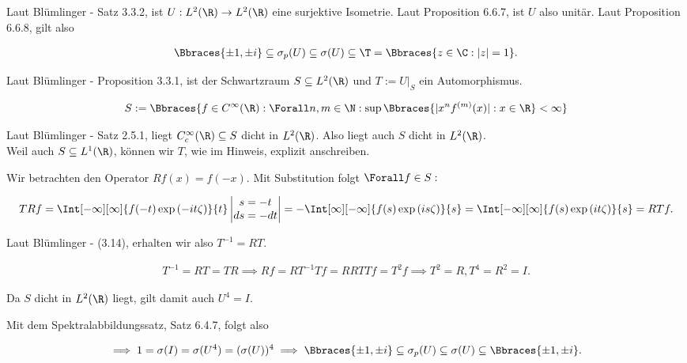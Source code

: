 \begin{solution}
Laut Blümlinger - Satz 3.3.2, ist $U: L^2(\R) \to L^2(\R)$ eine surjektive Isometrie.
Laut Proposition 6.6.7, ist $U$ also unitär.
Laut Proposition 6.6.8, gilt also

\begin{align*}
  \Bbraces{\pm 1, \pm i}
  \subseteq
  \sigma_p(U)
  \subseteq
  \sigma(U)
  \subseteq
  \T
  =
  \Bbraces{z \in \C: |z| = 1}.
\end{align*}


Laut Blümlinger - Proposition 3.3.1, ist der Schwartzraum $S \subseteq L^2(\R)$ und $T := U|_S$ ein Automorphismus.

\begin{align*}
  S
  :=
  \Bbraces
  {
    f \in C^\infty(\R):
    \Forall n, m \in \N:
    \sup \Bbraces{|x^n f^{(m)}(x)| : x \in \R} < \infty
  }
\end{align*}


Laut Blümlinger - Satz 2.5.1, liegt $C_c^\infty(\R) \subseteq S$ dicht in $L^2(\R)$.
Also liegt auch $S$ dicht in $L^2(\R)$. \\

Weil auch $S \subseteq L^1(\R)$, können wir $T$, wie im Hinweis, explizit anschreiben. \\


Wir betrachten den Operator $R f(x) = f(-x)$.
Mit Substitution folgt $\Forall f \in S:$

\begin{align*}
  T R f
  =
  \Int[-\infty][\infty]
  {f(-t) \exp{(-i t \zeta)}}{t}
  \begin{vmatrix}
    s = -t \\
    ds = -dt
  \end{vmatrix}
  =
  -\Int[\infty][-\infty]{f(s) \exp{(i s \zeta)}}{s}
  =
  \Int[-\infty][\infty]{f(s) \exp{(i t \zeta)}}{s}
  =
  R T f.
\end{align*}

Laut Blümlinger - (3.14), erhalten wir also $T^{-1} = R T$.

\begin{align*}
  T^{-1} = R T = T R
  \implies
  R f = R T^{-1} T f = R R T T f = T^2 f
  \implies
  T^2 = R, T^4 = R^2 = I.
\end{align*}

Da $S$ dicht in $L^2(\R)$ liegt, gilt damit auch $U^4 = I$.


Mit dem Spektralabbildungssatz, Satz 6.4.7, folgt also

\begin{align*}
  \implies
  1 = \sigma(I) = \sigma(U^4) = (\sigma(U))^4
  \implies
  \Bbraces{\pm 1, \pm i}
  \subseteq
  \sigma_p(U)
  \subseteq
  \sigma(U)
  \subseteq
  \Bbraces{\pm 1, \pm i}.
\end{align*}

\end{solution}
